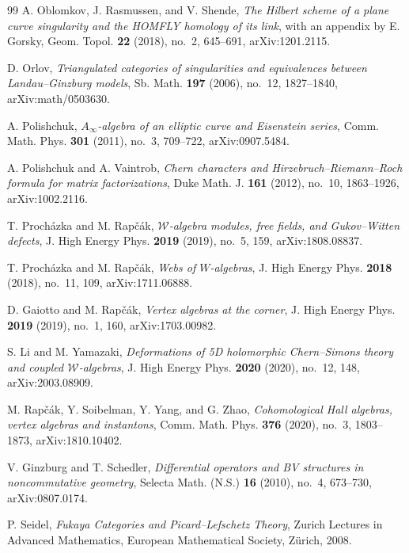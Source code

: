 \begin{thebibliography}{99}
A. Oblomkov, J. Rasmussen, and V. Shende, \emph{The Hilbert scheme of a plane curve singularity and the HOMFLY homology of its link}, with an appendix by E. Gorsky, Geom. Topol. \textbf{22} (2018), no.~2, 645--691, arXiv:1201.2115.

D. Orlov, \emph{Triangulated categories of singularities and equivalences between Landau--Ginzburg models}, Sb. Math. \textbf{197} (2006), no.~12, 1827--1840, arXiv:math/0503630.

A. Polishchuk, \emph{$A_\infty$-algebra of an elliptic curve and Eisenstein series}, Comm. Math. Phys. \textbf{301} (2011), no.~3, 709--722, arXiv:0907.5484.

A. Polishchuk and A. Vaintrob, \emph{Chern characters and Hirzebruch--Riemann--Roch formula for matrix factorizations}, Duke Math. J. \textbf{161} (2012), no.~10, 1863--1926, arXiv:1002.2116.

T. Proch\'azka and M. Rap\v{c}\'ak, \emph{$\mathcal{W}$-algebra modules, free fields, and Gukov--Witten defects}, J. High Energy Phys. \textbf{2019} (2019), no.~5, 159, arXiv:1808.08837.

T. Proch\'azka and M. Rap\v{c}\'ak, \emph{Webs of $W$-algebras}, J. High Energy Phys. \textbf{2018} (2018), no.~11, 109, arXiv:1711.06888.

D. Gaiotto and M. Rap\v{c}\'ak, \emph{Vertex algebras at the corner}, J. High Energy Phys. \textbf{2019} (2019), no.~1, 160, arXiv:1703.00982.

S. Li and M. Yamazaki, \emph{Deformations of 5D holomorphic Chern--Simons theory and coupled $\mathcal{W}$-algebras}, J. High Energy Phys. \textbf{2020} (2020), no.~12, 148, arXiv:2003.08909.

M. Rap\v{c}\'ak, Y. Soibelman, Y. Yang, and G. Zhao, \emph{Cohomological Hall algebras, vertex algebras and instantons}, Comm. Math. Phys. \textbf{376} (2020), no.~3, 1803--1873, arXiv:1810.10402.

V. Ginzburg and T. Schedler, \emph{Differential operators and BV structures in noncommutative geometry}, Selecta Math. (N.S.) \textbf{16} (2010), no.~4, 673--730, arXiv:0807.0174.

P. Seidel, \emph{Fukaya Categories and Picard--Lefschetz Theory}, Zurich Lectures in Advanced Mathematics, European Mathematical Society, Z\"urich, 2008.


\end{thebibliography}
